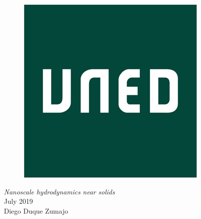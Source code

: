 \documentclass{beamer}
\begin{document}
\begin{frame}
\begin{figure}
\includegraphics[width=0.2\linewidth]{logo}
\end{figure}
  \vspace{0.5cm}  
\begin{center}
\textit{Nanoscale hydrodynamics near solids}\\
July 2019\\
Diego Duque Zumajo
\end{center}

\end{frame}
\end{document}

